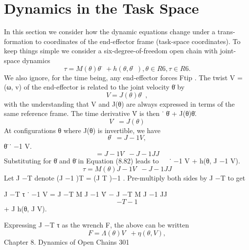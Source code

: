 \documentclass[12pt,a4paper]{article}
\begin{document}
\section{Dynamics in the Task Space}
In this section we consider how the dynamic equations change under a trans-
formation to coordinates of the end-effector frame (task-space coordinates). To
keep things simple we consider a six-degree-of-freedom open chain with joint-
space dynamics
\begin{equation}
τ = M (θ)θ̈ + h(θ, θ̇),           θ ∈ R6 , τ ∈ R6 .
\label{eq:8.82}
\end{equation}
We also ignore, for the time being, any end-effector forces Ftip . The twist
V = (ω, v) of the end-effector is related to the joint velocity θ̇ by
\begin{equation}
V = J(θ)θ̇,
\label{eq:8.83}
\end{equation}
with the understanding that V and J(θ) are always expressed in terms of the
same reference frame. The time derivative V̇ is then
                                              ˙ θ̇ + J(θ)θ̈.
\begin{equation}
V̇ = J(θ)
\label{eq:8.84}
\end{equation}
At configurations θ where J(θ) is invertible, we have
\begin{equation}
θ̇   = J −1 V,
\label{eq:8.85}
\end{equation}
                                  θ̈                     ˙ −1 V.
\begin{equation}
= J −1 V̇ − J −1 JJ
\label{eq:8.86}
\end{equation}
Substituting for θ̇ and θ̈ in Equation (8.82) leads to
                                                
                                           ˙ −1 V + h(θ, J −1 V).
\begin{equation}
τ = M (θ) J −1 V̇ − J −1 JJ
\label{eq:8.87}
\end{equation}
Let J −T denote (J −1 )T = (J T )−1 . Pre-multiply both sides by J −T to get

                      J −T τ                                     ˙ −1 V
                                 = J −T M J −1 V̇ − J −T M J −1 JJ
\begin{equation}
−T         −1
\label{eq:8.88}
\end{equation}
                                   + J h(θ, J V).

Expressing J −T τ as the wrench F, the above can be written
\begin{equation}
F = Λ(θ)V̇ + η(θ, V),
\label{eq:8.89}
\end{equation}
Chapter 8. Dynamics of Open Chains                                                                  301
\end{document}
